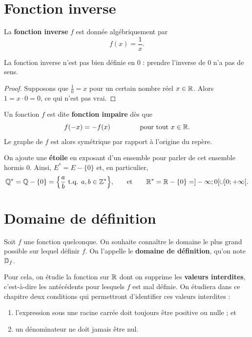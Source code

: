 \documentclass[a4paper, 12pt]{report}
\begin{document}
\section{Fonction inverse}

\begin{defn}
	La \textbf{fonction inverse} $f$ est donnée algébriquement par
		\[ f(x) = \dfrac1x. \]
\end{defn}


\begin{prop}
	La fonction inverse n'est pas bien définie en 0 : prendre l'inverse de 0 n'a pas de sens.
\end{prop}

\begin{proof}
	Supposons que $\frac10 = x$ pour un certain nombre réel $x\in\mathbb{R}$.
	Alors $1 = x\cdot0 = 0$, ce qui n'est pas vrai. 
\end{proof}

\begin{defn}
	Un fonction $f$ est dite \textbf{fonction impaire} dès que
		\[ f(-x) = -f(x) \qquad\qquad\text{ pour tout $x\in\mathbb{R}$.} \]
	Le graphe de $f$ est alors symétrique par rapport à l'origine du repère.
\end{defn}

\begin{nota}
	On ajoute une \textbf{étoile} en exposant d'un ensemble pour parler de cet ensemble hormis 0.
	Ainsi, $E^* = E - \{ 0 \}$ et, en particulier,
		\begin{align*}
			\mathbb{Q}^* = \mathbb{Q}-\{0\} = \Bigl\{ \dfrac{a}b \text{ t.q. } a, b\in\mathbb{Z}^* \Bigr\}, && \quad \text{et} \quad && \mathbb{R}^* = \mathbb{R}-\{0\} = ]-\infty ; 0[ \cup ]0 ; +\infty[.
		\end{align*}
\end{nota}

\section{Domaine de définition}

\begin{defn}
	Soit $f$ une fonction quelconque. On souhaite connaître le domaine le plus grand possible sur lequel définir $f$.
	On l'appelle le \textbf{domaine de définition}, qu'on note $\mathbb{D}_f$.
	
	Pour cela, on étudie la fonction sur $\mathbb{R}$ dont on supprime les \textbf{valeurs interdites}, c'est-à-dire les antécédents pour lesquels $f$ est mal définie.
	On étudiera dans ce chapitre deux conditions qui permettront d'identifier ces valeurs interdites :
		\begin{enumerate}
			\item l'expression sous une racine carrée doit toujours être positive ou nulle ; et
			\item un dénominateur ne doit jamais être nul.
		\end{enumerate}
\end{defn}
\end{document}
